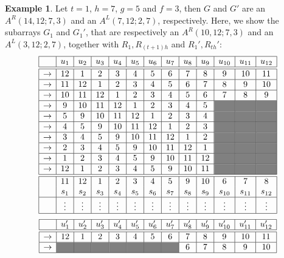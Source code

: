 \documentclass{amsart}
\theoremstyle{definition}
\newtheorem{ex}[prop]{Example}
\numberwithin{equation}{section}
\begin{document}
\begin{ex}
Let  $t = 1$, $h = 7$, $g = 5$ and $f= 3$, then $G$ and $G'$ are an $A^{R}(14, 12; 7,3)$ and an $A^{L}(7,12; 2,7)$, respectively. Here, we show the subarrays $G_1$ and $G_1'$, that are respectively an $A^{R}(10,12;7,3)$ and an $A^{L}(3,12;2,7)$, together with $R_1,R_{(t+1)h}$ and $R_1',R_{th}'$:
\[
\begin{array}{|c|c|c|c|c|c|c|c|c|c|c|c|c|}\hline
&u_1&u_2&u_3&u_4&u_5&u_6&u_7&u_8&u_9&u_{10}&u_{11}&u_{12}  \\ \hline \hline
\rightarrow&12&1&2&3&4&5&6&7&8&9&10&11 \\ \hline 
\rightarrow&11&12&1&2&3&4&5&6&7&8&9&10 \\ \hline 
\rightarrow&10&11&12&1&2&3&4&5&6&7&8&9 \\ \hline 
\rightarrow&9&10&11&12&1&2&3&4&5&\cellcolor{gray}&\cellcolor{gray}&\cellcolor{gray} \\ \hline 
\rightarrow&5&9&10&11&12&1&2&3&4&\cellcolor{gray}&\cellcolor{gray}&\cellcolor{gray} \\ \hline 
\rightarrow&4&5&9&10&11&12&1&2&3&\cellcolor{gray}&\cellcolor{gray}&\cellcolor{gray} \\ \hline 
\rightarrow&3&4&5&9&10&11&12&1&2&\cellcolor{gray}&\cellcolor{gray}&\cellcolor{gray} \\ \hline 
\rightarrow&2&3&4&5&9&10&11&12&1&\cellcolor{gray}&\cellcolor{gray}&\cellcolor{gray} \\ \hline 
\rightarrow&1&2&3&4&5&9&10&11&12&\cellcolor{gray}&\cellcolor{gray}&\cellcolor{gray} \\ \hline 
\rightarrow&12&1&2&3&4&5&9&10&11&\cellcolor{gray}&\cellcolor{gray}&\cellcolor{gray} \\ \hline  \hline
&11&12&1&2&3&4&5&9&10&6&7&8\\ 
&s_1&s_2&s_3&s_4&s_5&s_6&s_7&s_8&s_9&s_{10}&s_{11}&s_{12} \\\hline 
  &\vdots & \vdots & \vdots & \vdots & \vdots & \vdots & \vdots & \vdots & \vdots & \vdots & \vdots & \vdots   \\ \hline
\end{array}
\]
\[
\begin{array}{|c|c|c|c|c|c|c|c|c|c|c|c|c|}\hline
&u_1'&u_2'&u_3'&u_4'&u_5'&u_6'&u_7'&u_8'&u_9'&u_{10}'&u_{11}'&u_{12}'   \\ \hline \hline
\rightarrow&12&1&2&3&4&5&6&7&8&9&10&11 \\ \hline 
\rightarrow&\cellcolor{gray}&\cellcolor{gray}&\cellcolor{gray}&\cellcolor{gray}&\cellcolor{gray}&\cellcolor{gray}& \cellcolor{gray} &6&7&8&9&10 \\ \hline

\end{array}\]
\end{ex}
\end{document}
